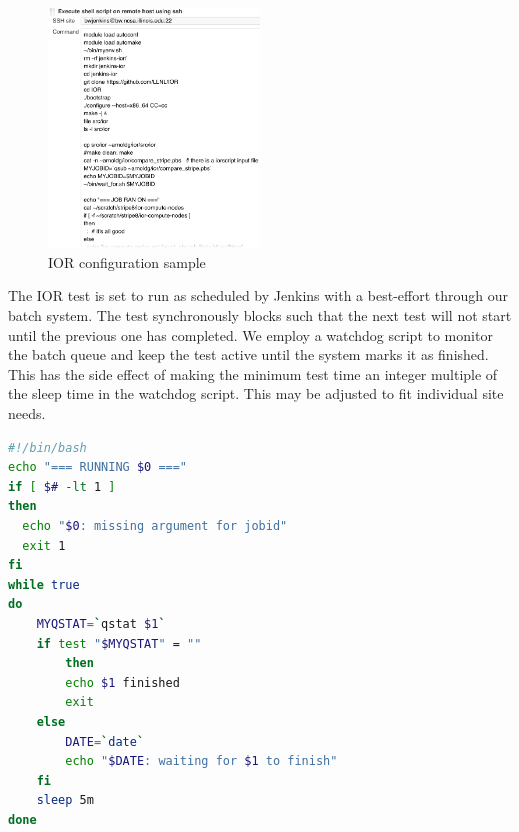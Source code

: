 \documentclass[10pt, conference, compsocconf]{IEEEtran}
\begin{document}
\begin{figure}[H]
\centering
\includegraphics[width=0.5\textwidth]{IOR-configuration-sample}
\caption{ IOR configuration sample }
\label{fig:IOR-configuration-sample}
\end{figure}
The IOR test is set to run as scheduled by Jenkins with a best-effort through our batch system.  The test synchronously blocks such that the next test will not start until the previous one has completed.  We employ a watchdog script to monitor the batch queue and keep the test active until the system marks it as finished.  This has the side effect of making the minimum test time an integer multiple of the sleep time in the watchdog script.  This may be adjusted to fit individual site needs.
\begin{lstlisting}[frame=tb,captionpos=t,language=bash,caption={pbs/torque watchdog script}, label=lst:watchdog]
#!/bin/bash
echo "=== RUNNING $0 ==="
if [ $# -lt 1 ]
then
  echo "$0: missing argument for jobid"
  exit 1
fi
while true
do
	MYQSTAT=`qstat $1`
	if test "$MYQSTAT" = ""
        then
		echo $1 finished
		exit
	else
		DATE=`date`
		echo "$DATE: waiting for $1 to finish"
	fi
	sleep 5m
done
\end{lstlisting}
\end{document}
